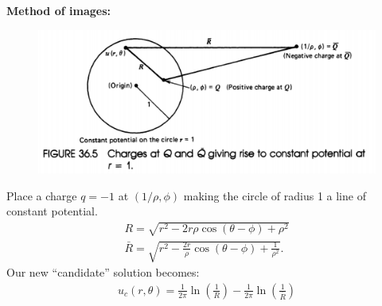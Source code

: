 \documentclass{book}
\theoremstyle{definition}
\newcommand{\f}[2]{\frac{#1}{#2}}
\newcommand{\lp}{\left(}
\newcommand{\rp}{\right)}
\begin{document}
\textbf{Method of images:} 
\begin{figure}[h!]
	\centering
	\includegraphics[scale=0.5]{charge2.png}
\end{figure}
Place a charge $q=-1$ at $(1/\rho,\phi)$ making the circle of radius 1 a line of constant potential. 
\begin{align*}
R = \sqrt{r^2 -2r\rho\cos(\theta-\phi) + \rho^2}\\
\bar{R} = \sqrt{r^2 - \f{2r}{\rho}\cos(\theta - \phi) + \f{1}{\rho^2}}.
\end{align*}
Our new ``candidate'' solution becomes:
\begin{align*}
\boxed{u_c(r,\theta) = \f{1}{2\pi}\ln\lp \f{1}{R} \rp - \f{1}{2\pi}\ln\lp \f{1}{\bar{R}} \rp}
\end{align*}


\end{document}
